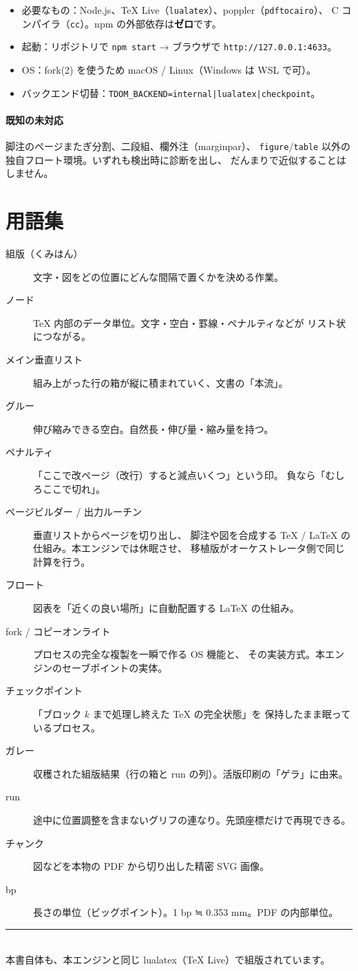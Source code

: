 \documentclass[11pt,a4paper]{ltjsarticle}
\newcommand{\code}[1]{\texttt{#1}}
\begin{document}
\begin{itemize}
\item 必要なもの：Node.js、TeX Live（\code{lualatex}）、poppler（\code{pdftocairo}）、
  C コンパイラ（\code{cc}）。npm の外部依存は\textbf{ゼロ}です。
\item 起動：リポジトリで \code{npm start} → ブラウザで \code{http://127.0.0.1:4633}。
\item OS：fork(2) を使うため macOS / Linux（Windows は WSL で可）。
\item バックエンド切替：\code{TDOM\_BACKEND=internal|lualatex|checkpoint}。
\end{itemize}

\paragraph{既知の未対応}
脚注のページまたぎ分割、二段組、欄外注（marginpar）、
\code{figure}/\code{table} 以外の独自フロート環境。いずれも検出時に診断を出し、
だんまりで近似することはしません。

\section{用語集}

\begin{description}
\item[組版（くみはん）] 文字・図をどの位置にどんな間隔で置くかを決める作業。
\item[ノード] TeX 内部のデータ単位。文字・空白・罫線・ペナルティなどが
  リスト状につながる。
\item[メイン垂直リスト] 組み上がった行の箱が縦に積まれていく、文書の「本流」。
\item[グルー] 伸び縮みできる空白。自然長・伸び量・縮み量を持つ。
\item[ペナルティ] 「ここで改ページ（改行）すると減点いくつ」という印。
  負なら「むしろここで切れ」。
\item[ページビルダー / 出力ルーチン] 垂直リストからページを切り出し、
  脚注や図を合成する TeX / LaTeX の仕組み。本エンジンでは休眠させ、
  移植版がオーケストレータ側で同じ計算を行う。
\item[フロート] 図表を「近くの良い場所」に自動配置する LaTeX の仕組み。
\item[fork / コピーオンライト] プロセスの完全な複製を一瞬で作る OS 機能と、
  その実装方式。本エンジンのセーブポイントの実体。
\item[チェックポイント] 「ブロック $k$ まで処理し終えた TeX の完全状態」を
  保持したまま眠っているプロセス。
\item[ガレー] 収穫された組版結果（行の箱と run の列）。活版印刷の「ゲラ」に由来。
\item[run] 途中に位置調整を含まないグリフの連なり。先頭座標だけで再現できる。
\item[チャンク] 図などを本物の PDF から切り出した精密 SVG 画像。
\item[bp] 長さの単位（ビッグポイント）。1 bp ≒ 0.353 mm。PDF の内部単位。
\end{description}

\vspace{1.5em}
\begin{center}
\rule{0.6\textwidth}{0.4pt}\\[0.5em]
\small 本書自体も、本エンジンと同じ lualatex（TeX Live）で組版されています。
\end{center}
\end{document}
